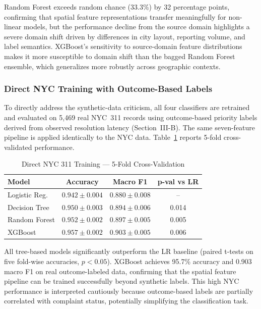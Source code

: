 \documentclass[conference]{IEEEtran}
\begin{document}
Random Forest exceeds random chance (33.3\%) by 32 percentage points, confirming that spatial feature representations transfer meaningfully for non-linear models, but the performance decline from the source domain highlights a severe domain shift driven by differences in city layout, reporting volume, and label semantics. XGBoost's sensitivity to source-domain feature distributions makes it more susceptible to domain shift than the bagged Random Forest ensemble, which generalizes more robustly across geographic contexts.

\subsubsection{Direct NYC Training with Outcome-Based Labels}

To directly address the synthetic-data criticism, all four classifiers are retrained and evaluated on 5,469 real NYC~311 records using outcome-based priority labels derived from observed resolution latency (Section~III-B). The same seven-feature pipeline is applied identically to the NYC data. Table~\ref{tab:nyc311_direct} reports 5-fold cross-validated performance.

\begin{table}[h]
\centering
\caption{Direct NYC 311 Training --- 5-Fold Cross-Validation}
\label{tab:nyc311_direct}
\begin{tabular}{lccc}
\toprule
Model & Accuracy & Macro F1 & p-val vs LR \\
\midrule
Logistic Reg. & $0.942 \pm 0.004$ & $0.880 \pm 0.008$ & -- \\
Decision Tree & $0.950 \pm 0.003$ & $0.894 \pm 0.006$ & 0.014 \\
Random Forest & $0.952 \pm 0.002$ & $0.897 \pm 0.005$ & 0.005 \\
XGBoost & $0.957 \pm 0.002$ & $0.903 \pm 0.005$ & 0.006 \\
\bottomrule
\end{tabular}
\end{table}

All tree-based models significantly outperform the LR baseline (paired t-tests on five fold-wise accuracies, $p < 0.05$). XGBoost achieves 95.7\% accuracy and 0.903 macro F1 on real outcome-labeled data, confirming that the spatial feature pipeline can be trained successfully beyond synthetic labels. This high NYC performance is interpreted cautiously because outcome-based labels are partially correlated with complaint status, potentially simplifying the classification task.
\end{document}
